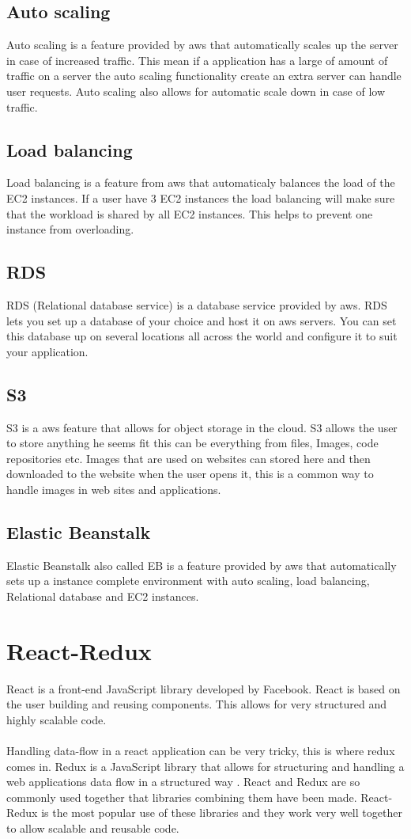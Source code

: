 \subsection{Auto scaling}
Auto scaling is a feature provided by aws that automatically scales up the server in case of increased traffic. This mean if a application has a large of amount of traffic on a server the auto scaling functionality create an extra server can handle user requests. Auto scaling also allows for automatic scale down in case of low traffic. 
\subsection{Load balancing}
Load balancing is a feature from aws that automaticaly balances the load of the EC2 instances. If a user have 3 EC2 instances the load balancing will make sure that the workload is shared by all EC2 instances. This helps to prevent one instance from overloading.
\subsection{RDS}
RDS (Relational database service) is a database service provided by aws. RDS lets you set up a database of your choice and host it on aws servers. You can set this database up on several locations all across the world and configure it to suit your application.
\subsection{S3}
S3 is a aws feature that allows for object storage in the cloud. S3 allows the user to store anything he seems fit this can be everything from files, Images, code repositories etc. Images that are used on websites can stored here and then downloaded to the website when the user opens it, this is a common way to handle images in web sites and applications.
\subsection{Elastic Beanstalk}
Elastic Beanstalk also called EB is a feature provided by aws that automatically sets up a instance complete environment with auto scaling, load balancing, Relational database and EC2 instances.
\section{React-Redux}
React is a front-end JavaScript library developed by Facebook. React is based on the user building and reusing components. This allows for very structured and highly scalable code.
\\\\
Handling data-flow in a react application can be very tricky, this is where redux comes in. Redux is a JavaScript library that allows for structuring and handling a web applications data flow in a structured way . React and Redux are so commonly used together that libraries combining them have been made. React-Redux is the most popular use of these libraries and they work very well together to allow scalable and reusable code. 

